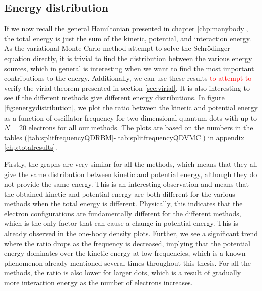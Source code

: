 \subsection{Energy distribution} \label{sec:energydistributions}
If we now recall the general Hamiltonian presented in chapter \ref{chp:manybody}, the total energy is just the sum of the kinetic, potential, and interaction energy. As the variational Monte Carlo method attempt to solve the Schrödinger equation directly, it is trivial to find the distribution between the various energy sources, which in general is interesting when we want to find the most important contributions to the energy. Additionally, we can use these results \textcolor{red}{to attempt to} verify the virial theorem presented in section \ref{sec:virial}. It is also interesting to see if the different methods give different energy distributions. In figure \eqref{fig:energydistribution}, we plot the ratio between the kinetic and potential energy as a function of oscillator frequency for two-dimensional quantum dots with up to $N=20$ electrons for all our methods. The plots are based on the numbers in the tables (\ref{tab:splitfrequencyQDRBM}-\ref{tab:splitfrequencyQDVMC}) in appendix \ref{chp:totalresults}. 



Firstly, the graphs are very similar for all the methods, which means that they all give the same distribution between kinetic and potential energy, although they do not provide the same energy. This is an interesting observation and means that the obtained kinetic and potential energy are both different for the various methods when the total energy is different. Physically, this indicates that the electron configurations are fundamentally different for the different methods, which is the only factor that can cause a change in potential energy. This is already observed in the one-body density plots. Further, we see a significant trend where the ratio drops as the frequency is decreased, implying that the potential energy dominates over the kinetic energy at low frequencies, which is a known phenomenon already mentioned several times throughout this thesis. For all the methods, the ratio is also lower for larger dots, which is a result of gradually more interaction energy as the number of electrons increases.

